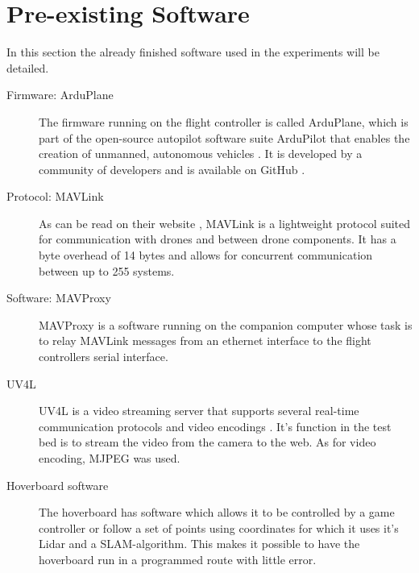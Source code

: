 \documentclass[nofilelist]{cslthse-msc}
\begin{document}
\section{Pre-existing Software}
In this section the already finished software used in the experiments will be detailed.

\begin{description}
   \item[Firmware: ArduPlane]
   The firmware running on the flight controller is called ArduPlane, which is part of the open-source autopilot software suite ArduPilot that enables the creation of unmanned, autonomous vehicles \cite{ardupilot-org}. It is developed by a community of developers and is available on GitHub \cite{ardupilot-github}.
   
   \item[Protocol: MAVLink]
   As can be read on their website \cite{mavlink}, MAVLink is a lightweight protocol suited for communication with drones and between drone components. It has a byte overhead of 14 bytes and allows for concurrent communication between up to 255 systems. 

   \item [Software: MAVProxy]
   MAVProxy \cite{mavproxy} is a software running on the companion computer whose task is to relay MAVLink messages from an ethernet interface to the flight controllers serial interface. 

   \item[UV4L]
   UV4L is a video streaming server that supports several real-time communication protocols and video encodings \cite{uv4l}. It's function in the test bed is to stream the video from the camera to the web. As for video encoding, MJPEG was used.
   

   \item[Hoverboard software] The hoverboard has software which allows it to be controlled by a game controller or follow a set of points using coordinates for which it uses it's Lidar and a SLAM-algorithm. This makes it possible to have the hoverboard run in a programmed route with little error. 
\end{description}
\end{document}
